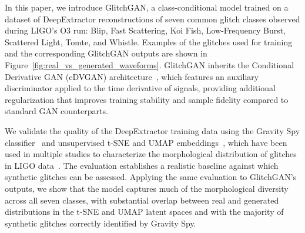 \documentclass[reprint,nofootinbib,amsmath,amssymb,aps,floatfix]{revtex4-2}
\begin{document}
In this paper, we introduce GlitchGAN, a class-conditional model trained on a dataset of DeepExtractor reconstructions of seven common glitch classes observed during LIGO's O3 run: Blip, Fast Scattering, Koi Fish, Low-Frequency Burst, Scattered Light, Tomte, and Whistle.
Examples of the glitches used for training and the corresponding GlitchGAN outputs are shown in Figure~\ref{fig:real_vs_generated_waveforms}.
GlitchGAN inherits the Conditional Derivative GAN (cDVGAN) architecture~\cite{cdvgan, dooney2022dvgan}, which features an auxiliary discriminator applied to the time derivative of signals, providing additional regularization that improves training stability and sample fidelity compared to standard GAN counterparts.

We validate the quality of the DeepExtractor training data using the Gravity Spy classifier~\cite{Zevin_2017, Glanzer_2023, GspyO4} and unsupervised t-SNE \cite{TSNE} and UMAP embeddings~\cite{McInnes_2018}, which have been used in multiple studies to characterize the morphological distribution of glitches in LIGO data~\cite{ferreira2025analysisligoglitchesusing, Ferreira_2025, deshmukh2026soundnoiseleveraginginductive}.
The evaluation establishes a realistic baseline against which synthetic glitches can be assessed.
Applying the same evaluation to GlitchGAN's outputs, we show that the model captures much of the morphological diversity across all seven classes, with substantial overlap between real and generated distributions in the t-SNE and UMAP latent spaces and with the majority of synthetic glitches correctly identified by Gravity Spy.
\end{document}
